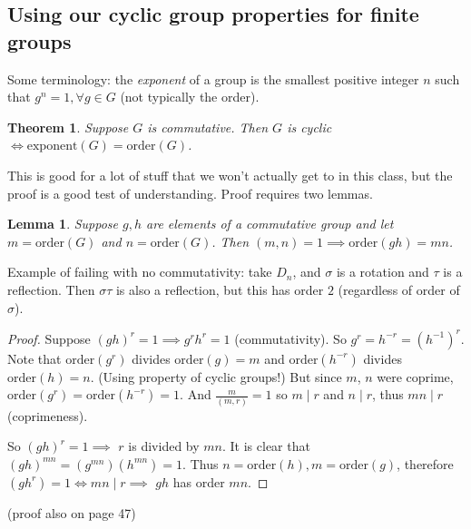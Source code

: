 \documentclass{article}
\theoremstyle{plain}
\newtheorem{theorem}{Theorem}
\newtheorem{lemma}{Lemma}
\theoremstyle{remark}
\begin{document}
\subsection{Using our cyclic group properties for finite groups}

Some terminology: the {\it exponent} of a group
is the smallest positive integer $n$ such that $g^n = 1, \forall g \in G$
(not typically the order).
\begin{theorem}
	Suppose $G$ is commutative.
	Then $G$ is cyclic $\iff \mathrm{exponent}(G) = \mathrm{order}(G)$.
\end{theorem}
This is good for a lot of stuff that we won't actually get to in this class,
but the proof is a good test of understanding.
Proof requires two lemmas.
\begin{lemma}
	Suppose $g,h$ are elements of a commutative group
	and let $m = \mathrm{order}(G)$ and $n = \mathrm{order}(G)$.
	Then $(m,n) = 1 \implies \mathrm{order}(gh) = mn$.
\end{lemma}
Example of failing with no commutativity:
take $D_n$, and $\sigma$ is a rotation and $\tau$ is a reflection.
Then $\sigma \tau$ is also a reflection, but this has order $2$
(regardless of order of $\sigma$).
\begin{proof}
	Suppose $(gh)^r = 1 \implies g^rh^r = 1$ (commutativity).
	So $g^r = h^{-r} = (h^{-1})^r$.
	Note that $\mathrm{order}(g^r)$ divides $\mathrm{order}(g) = m$
	and $\mathrm{order}(h^{-r})$ divides $\mathrm{order}(h) = n$.
	(Using property of cyclic groups!)
	But since $m$, $n$ were coprime,
	$\mathrm{order}(g^r) = \mathrm{order}(h^{-r}) = 1$.
	And $\frac{m}{(m,r)} = 1$ so $m \mid r$ and $n \mid r$,
	thus $mn \mid r$ (coprimeness).

	So $(gh)^r = 1 \implies$ $r$ is divided by $mn$.
	It is clear that $(gh)^{mn} = (g^{mn})(h^{mn}) = 1$.
	Thus $n = \mathrm{order}(h), m = \mathrm{order}(g)$,
	therefore $(gh^r) = 1 \iff mn \mid r \implies$
	$gh$ has order $mn$.
\end{proof}
(proof also on page 47)
\end{document}
